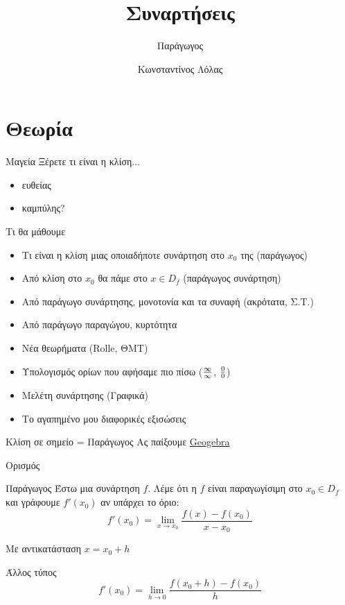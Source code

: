 \documentclass[greek]{beamer}
\title{Συναρτήσεις}
\subtitle{Παράγωγος}
\author[Λόλας]{Κωνσταντίνος Λόλας}
\date{}
\begin{document}
\begin{frame}
 \titlepage
\end{frame}

\section{Θεωρία}
\begin{frame}{Μαγεία}
 Ξέρετε τι είναι η κλίση...
 \begin{itemize}
  \item<1-> ευθείας
  \item<2-> καμπύλης?
 \end{itemize}
\end{frame}

\begin{frame}{Τι θα μάθουμε}
 \begin{itemize}
  \item<1-> Τι είναι η κλίση μιας οποιαδήποτε συνάρτηση στο $x_0$ της (παράγωγος)
  \item<2-> Από κλίση στο $x_0$ θα πάμε στο $x\in D_f$ (παράγωγος συνάρτηση)
  \item<3-> Από παράγωγο συνάρτησης, μονοτονία και τα συναφή (ακρότατα, Σ.Τ.)
  \item<4-> Από παράγωγο παραγώγου, κυρτότητα
  \item<5-> Νέα θεωρήματα (Rolle, ΘΜΤ)
  \item<6-> Υπολογισμός ορίων που αφήσαμε πιο πίσω ($\infty \over \infty$, $0 \over 0$)
  \item<7-> Μελέτη συνάρτησης (Γραφικά)
  \item<8-> Το αγαπημένο μου  διαφορικές εξισώσεις
 \end{itemize}
\end{frame}

\begin{frame}{Κλίση σε σημείο = Παράγωγος}
 Ας παίξουμε
 \href{https://www.geogebra.org/m/v6g6qvfw}{Geogebra}
\end{frame}

\begin{frame}{Ορισμός}
 \begin{block}{Παράγωγος}
  Έστω μια συνάρτηση $f$. Λέμε ότι η $f$ είναι παραγωγίσιμη στο $x_0\in D_f$ και γράφουμε $f'(x_0)$ αν υπάρχει το όριο:
  $$f'(x_0)=\lim\limits_{x \to x_0}{ \frac{f(x)-f(x_0)}{x-x_0} }$$
 \end{block}

 Με αντικατάσταση $x=x_0+h$
 \begin{block}{Άλλος τύπος}
  $$f'(x_0)=\lim\limits_{h \to 0}{ \frac{f(x_0+h)-f(x_0)}{h} }$$
 \end{block}
\end{frame}
\end{document}

